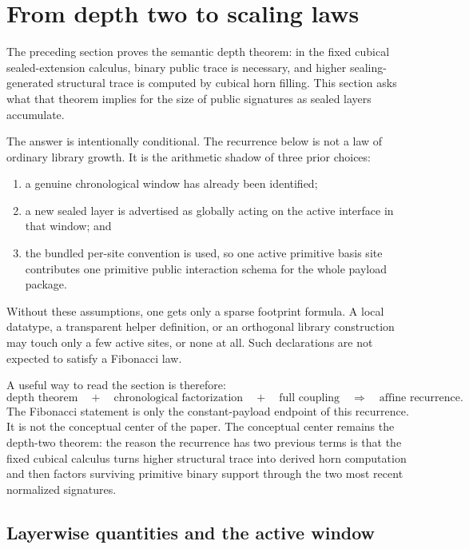 \section{From depth two to scaling laws}
\label{sec:scaling}

The preceding section proves the semantic depth theorem: in the fixed cubical sealed-extension
calculus, binary public trace is necessary, and higher sealing-generated structural trace is
computed by cubical horn filling.  This section asks what that theorem implies for the size of
public signatures as sealed layers accumulate.

The answer is intentionally conditional.  The recurrence below is not a law of ordinary
library growth.  It is the arithmetic shadow of three prior choices:
\begin{enumerate}
\item a genuine chronological window has already been identified;
\item a new sealed layer is advertised as globally acting on the active interface in that
window; and
\item the bundled per-site convention is used, so one active primitive basis site contributes
one primitive public interaction schema for the whole payload package.
\end{enumerate}
Without these assumptions, one gets only a sparse footprint formula.  A local datatype, a
transparent helper definition, or an orthogonal library construction may touch only a few
active sites, or none at all.  Such declarations are not expected to satisfy a Fibonacci law.

A useful way to read the section is therefore:
\[
  \text{depth theorem}
  \quad+\quad
  \text{chronological factorization}
  \quad+\quad
  \text{full coupling}
  \quad\Longrightarrow\quad
  \text{affine recurrence}.
\]
The Fibonacci statement is only the constant-payload endpoint of this recurrence.  It is not
the conceptual center of the paper.  The conceptual center remains the depth-two theorem: the
reason the recurrence has two previous terms is that the fixed cubical calculus turns higher
structural trace into derived horn computation and then factors surviving primitive binary
support through the two most recent normalized signatures.

\subsection{Layerwise quantities and the active window}
\label{subsec:layerwise-quantities}

